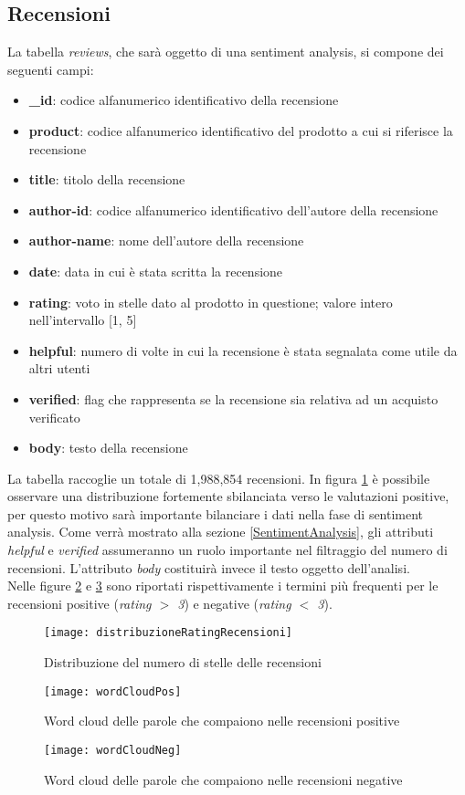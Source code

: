 \subsection{Recensioni}\label{Recensioni}
La tabella \textit{reviews}, che sarà oggetto di una sentiment analysis, si compone dei seguenti campi:
\begin{itemize}
    \item \textbf{\_id}: codice alfanumerico identificativo della recensione
    \item \textbf{product}: codice alfanumerico identificativo del prodotto a cui si riferisce la recensione
    \item \textbf{title}: titolo della recensione
    \item \textbf{author-id}: codice alfanumerico identificativo dell'autore della recensione
    \item \textbf{author-name}: nome dell'autore della recensione
    \item \textbf{date}: data in cui è stata scritta la recensione
    \item \textbf{rating}: voto in stelle dato al prodotto in questione; valore intero nell'intervallo [1, 5]
    \item \textbf{helpful}: numero di volte in cui la recensione è stata segnalata come utile da altri utenti
    \item \textbf{verified}: flag che rappresenta se la recensione sia relativa ad un acquisto verificato
    \item \textbf{body}: testo della recensione
\end{itemize} 
La tabella raccoglie un totale di 1,988,854 recensioni. In figura \ref{fig:distribuzioneRatingRecensioni} è possibile osservare una distribuzione fortemente sbilanciata verso le valutazioni positive, per questo motivo sarà importante bilanciare i dati nella fase di sentiment analysis. Come verrà mostrato alla sezione \ref{SentimentAnalysis}, gli attributi \textit{helpful} e \textit{verified} assumeranno un ruolo importante nel filtraggio del numero di recensioni. L'attributo \textit{body} costituirà invece il testo oggetto dell'analisi.\\
Nelle figure \ref{fig:wordCloudPos} e \ref{fig:wordCloudNeg} sono riportati rispettivamente i termini più frequenti per le recensioni positive (\textit{rating $>$ 3}) e negative (\textit{rating $<$ 3}). 
\begin{figure}[H]
    \texttt{[image: distribuzioneRatingRecensioni]}\centering
    \caption{Distribuzione del numero di stelle delle recensioni}\label{fig:distribuzioneRatingRecensioni}
\end{figure}
\begin{figure}[H]
    \texttt{[image: wordCloudPos]}\centering
    \caption{Word cloud delle parole che compaiono nelle recensioni positive}\label{fig:wordCloudPos}
\end{figure}
\begin{figure}[H]
    \texttt{[image: wordCloudNeg]}\centering
    \caption{Word cloud delle parole che compaiono nelle recensioni negative}\label{fig:wordCloudNeg}
\end{figure}



